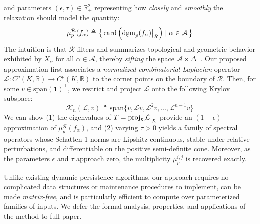 \documentclass[10pt twocolumn]{article}
\numberwithin{equation}{section}
\newcommand{\+}{%
	\raisebox{0.18ex}{\scaleobj{0.55}{+}}
}
\newcommand\restr[2]{{%
  \left.\kern-\nulldelimiterspace %
  #1 %
  \vphantom{\big|} %
  \right|_{#2} %
  }}
\theoremstyle{definition}
\theoremstyle{definition}
\begin{document}
\begin{multicols}{2}
and parameters $(\epsilon, \tau ) \in \mathbb{R}_+^2$ representing how \emph{closely} and \emph{smoothly} the relaxation should model the quantity: 
	\begin{equation*}\label{eq:mu_alpha}
		\mu_p^{\mathcal{R}}(f_\alpha) \triangleq \big\{ \, 
	\mathrm{card}\left(\restr{\mathrm{dgm}_p(f_\alpha)}{\mathcal{R}} \right) \mid \alpha \in \mathcal{A} \, \big\}
	\end{equation*}
The intuition is that $\mathcal{R}$ filters and summarizes topological and geometric behavior exhibited by $X_\alpha$ for all $\alpha \in \mathcal{A}$, thereby \emph{sifting} the space $\mathcal{A} \times \Delta_+$. 
Our proposed approximation first associates a \emph{normalized combinatorial Laplacian} operator $\mathcal{L} : C^p(K, \mathbb{R}) \to C^p(K, \mathbb{R})$ to the corner points on the boundary of $\mathcal{R}$. Then, for some $v \in \mathrm{span}(\textbf{1})^\perp$, we restrict and project $\mathcal{L}$ onto the following Krylov subspace: 
	\begin{equation*}
	\mathcal{K}_n(\mathcal{L}, v) \triangleq \mathrm{span}\{ v, \mathcal{L}v, \mathcal{L}^2 v, \dots, \mathcal{L}^{n-1}v \}
	\end{equation*}
	We can show (1) the eigenvalues of $T = \mathrm{proj}_{\mathcal{K}} \restr{\mathcal{L}}{\mathcal{K}}$ provide an $(1-\epsilon)$-approximation of $\mu_p^{\mathcal{R}}(f_\alpha)$, 
	and (2) varying $\tau > 0$ yields a family of spectral operators whose Schatten-1 norms are Lipshitz continuous, stable under relative perturbations, and differentiable on the positive semi-definite cone. Moreover, as the parameters $\epsilon$ and $\tau$ approach zero, the multiplicity $\mu_p^{i,j}$ is recovered exactly. 

Unlike existing dynamic persistence algorithms, our approach requires no complicated data structures or maintenance procedures to implement, can be made \emph{matrix-free}, and is particularly efficient to compute over parameterized families of inputs.
We defer the formal analysis, properties, and applications of the method to full paper. 


\end{multicols}
\end{document}
